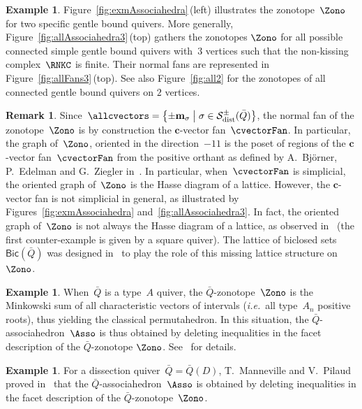 \documentclass{memo-l}
\theoremstyle{definition}
\newtheorem{example}[theorem]{Example}
\newtheorem{remark}[theorem]{Remark}
\renewcommand{\b}[1]{\mathbf{#1}} %
\newcommand{\set}[2]{\left\{ #1 \;\middle|\; #2 \right\}} %
\newcommand{\one}{{1\!\!1}} %
\newcommand{\fref}[1]{Figure~\ref{#1}} %
\newcommand{\ie}{\textit{i.e.}~} %
\newcommand{\distinguishableStrings}{\mathcal{S}_\mathrm{dist}} %
\newcommand{\Bicl}[1]{\mathsf{Bic}(#1)} %
\newcommand{\multiplicityVector}{\b{m}} %
\begin{document}
\begin{example}
\fref{fig:exmAssociahedra}\,(left) illustrates the zonotope~$\Zono$ for two specific gentle bound quivers.
More generally, \fref{fig:allAssociahedra3}\,(top) gathers the zonotopes $\Zono$ for all possible connected simple gentle bound quivers with~$3$ vertices such that the non-kissing complex~$\RNKC$ is finite.
Their normal fans are represented in \fref{fig:allFans3}\,(top).
See also \fref{fig:all2} for the zonotopes of all connected gentle bound quivers on $2$ vertices.
\end{example}

\begin{remark}
Since~$\allcvectors = \set{\pm \multiplicityVector_\sigma}{\sigma \in \distinguishableStrings^\pm(\bar Q)}$, the normal fan of the zonotope~$\Zono$ is by construction the $\b{c}$-vector fan~$\cvectorFan$.
In particular, the graph of~$\Zono$, oriented in the direction~$-\one$ is the poset of regions of the $\b{c}$-vector fan~$\cvectorFan$ from the positive orthant as defined by A.~Bj\"orner, P.~Edelman and G.~Ziegler in~\cite{BjornerEdelmanZiegler}.
In particular, when~$\cvectorFan$ is simplicial, the oriented graph of~$\Zono$ is the Hasse diagram of a lattice.
However, the $\b{c}$-vector fan is not simplicial in general, as illustrated by Figures~\ref{fig:exmAssociahedra} and~\ref{fig:allAssociahedra3}.
In fact, the oriented graph of~$\Zono$ is not always the Hasse diagram of a lattice, as observed in~\cite[Rem.~6.2]{McConville} (the first counter-example is given by a square quiver).
The lattice of biclosed sets~$\Bicl{\bar Q}$ was designed in~\cite{McConville} to play the role of this missing lattice structure on~$\Zono$.
\end{remark}

\begin{example}
\label{exm:permutahedron}
When~$\bar Q$ is a type~$A$ quiver, the $\bar Q$-zonotope~$\Zono$ is the Minkowski sum of all characteristic vectors of intervals (\ie all type~$A_n$ positive roots), thus yielding the classical permutahedron.
In this situation, the $\bar Q$-associahedron~$\Asso$ is thus obtained by deleting inequalities in the facet description of the $\bar Q$-zonotope $\Zono$.
See~\cite{Loday, HohlwegLange, LangePilaud} for details.
\end{example}

\begin{example}
For a dissection quiver~$\bar Q = \bar Q(D)$, T.~Manneville and V.~Pilaud proved in~\cite{MannevillePilaud-accordion} that the $\bar Q$-associahedron~$\Asso$ is obtained by deleting inequalities in the facet description of the $\bar Q$-zonotope~$\Zono$.
\end{example}
\end{document}
